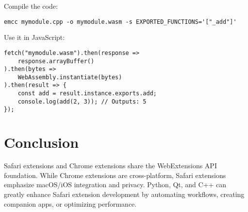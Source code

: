 \documentclass[a4paper,12pt]{article}
\begin{document}
Compile the code:

\begin{ExampleBox}
    \begin{verbatim}
emcc mymodule.cpp -o mymodule.wasm -s EXPORTED_FUNCTIONS='["_add"]'
\end{verbatim}
\end{ExampleBox}

Use it in JavaScript:

\begin{ExampleBox}
    \begin{verbatim}
fetch("mymodule.wasm").then(response =>
    response.arrayBuffer()
).then(bytes =>
    WebAssembly.instantiate(bytes)
).then(result => {
    const add = result.instance.exports.add;
    console.log(add(2, 3)); // Outputs: 5
});
\end{verbatim}
\end{ExampleBox}

\section{Conclusion}
Safari extensions and Chrome extensions share the WebExtensions API foundation. While Chrome extensions are cross-platform, Safari extensions emphasize macOS/iOS integration and privacy. Python, Qt, and C++ can greatly enhance Safari extension development by automating workflows, creating companion apps, or optimizing performance.
\end{document}
